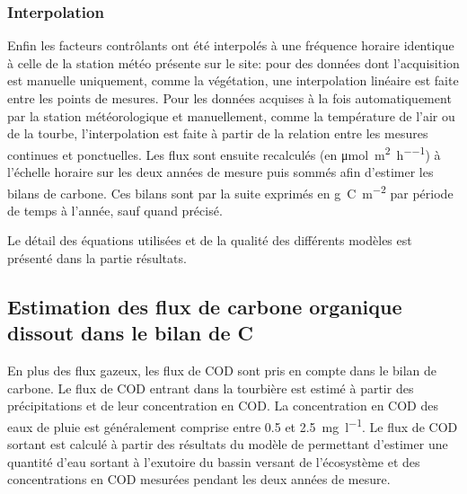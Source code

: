 \subsubsection{Interpolation}

Enfin les facteurs contrôlants ont été interpolés à une fréquence horaire identique à celle de la station météo présente sur le site:
pour des données dont l'acquisition est manuelle uniquement, comme la végétation, une interpolation linéaire est faite entre les points de mesures.
Pour les données acquises à la fois automatiquement par la station météorologique et manuellement, comme la température de l'air ou de la tourbe, l'interpolation est faite à partir de la relation entre les mesures continues et ponctuelles.
Les flux sont ensuite recalculés (en \si{\micro\mole\per\square\meter\per\hour}) à l'échelle horaire sur les deux années de mesure puis sommés afin d'estimer les bilans de carbone.
Ces bilans sont par la suite exprimés en \si{\gram C m^{-2}} par période de temps à l'année, sauf quand précisé.

Le détail des équations utilisées et de la qualité des différents modèles est présenté dans la partie résultats.

\subsection{Estimation des flux de carbone organique dissout dans le bilan de C}

En plus des flux gazeux, les flux de COD sont pris en compte dans le bilan de carbone.
Le flux de COD entrant dans la tourbière est estimé à partir des précipitations et de leur concentration en COD.
La concentration en COD des eaux de pluie est généralement comprise entre \num{0.5} et \SI{2.5}{\milli\gram\per\litre}\citep{sigg2014}.
Le flux de COD sortant est calculé à partir des résultats  du modèle de \citet{binet2013} permettant d'estimer une quantité d'eau sortant à l'exutoire du bassin versant de l'écosystème et des concentrations en COD mesurées pendant les deux années de mesure.

